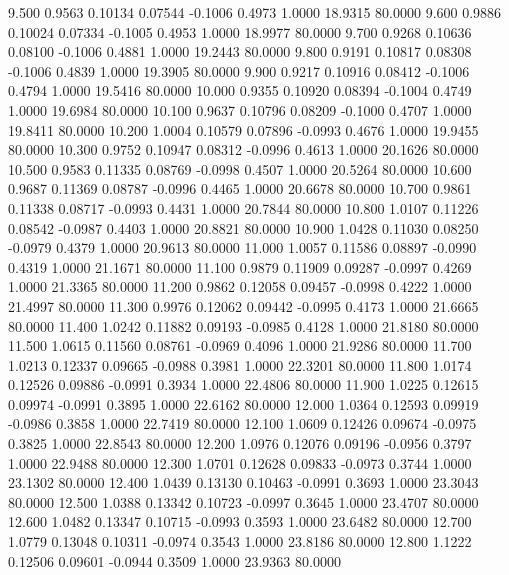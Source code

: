    9.500   0.9563   0.10134   0.07544  -0.1006   0.4973   1.0000  18.9315  80.0000
   9.600   0.9886   0.10024   0.07334  -0.1005   0.4953   1.0000  18.9977  80.0000
   9.700   0.9268   0.10636   0.08100  -0.1006   0.4881   1.0000  19.2443  80.0000
   9.800   0.9191   0.10817   0.08308  -0.1006   0.4839   1.0000  19.3905  80.0000
   9.900   0.9217   0.10916   0.08412  -0.1006   0.4794   1.0000  19.5416  80.0000
  10.000   0.9355   0.10920   0.08394  -0.1004   0.4749   1.0000  19.6984  80.0000
  10.100   0.9637   0.10796   0.08209  -0.1000   0.4707   1.0000  19.8411  80.0000
  10.200   1.0004   0.10579   0.07896  -0.0993   0.4676   1.0000  19.9455  80.0000
  10.300   0.9752   0.10947   0.08312  -0.0996   0.4613   1.0000  20.1626  80.0000
  10.500   0.9583   0.11335   0.08769  -0.0998   0.4507   1.0000  20.5264  80.0000
  10.600   0.9687   0.11369   0.08787  -0.0996   0.4465   1.0000  20.6678  80.0000
  10.700   0.9861   0.11338   0.08717  -0.0993   0.4431   1.0000  20.7844  80.0000
  10.800   1.0107   0.11226   0.08542  -0.0987   0.4403   1.0000  20.8821  80.0000
  10.900   1.0428   0.11030   0.08250  -0.0979   0.4379   1.0000  20.9613  80.0000
  11.000   1.0057   0.11586   0.08897  -0.0990   0.4319   1.0000  21.1671  80.0000
  11.100   0.9879   0.11909   0.09287  -0.0997   0.4269   1.0000  21.3365  80.0000
  11.200   0.9862   0.12058   0.09457  -0.0998   0.4222   1.0000  21.4997  80.0000
  11.300   0.9976   0.12062   0.09442  -0.0995   0.4173   1.0000  21.6665  80.0000
  11.400   1.0242   0.11882   0.09193  -0.0985   0.4128   1.0000  21.8180  80.0000
  11.500   1.0615   0.11560   0.08761  -0.0969   0.4096   1.0000  21.9286  80.0000
  11.700   1.0213   0.12337   0.09665  -0.0988   0.3981   1.0000  22.3201  80.0000
  11.800   1.0174   0.12526   0.09886  -0.0991   0.3934   1.0000  22.4806  80.0000
  11.900   1.0225   0.12615   0.09974  -0.0991   0.3895   1.0000  22.6162  80.0000
  12.000   1.0364   0.12593   0.09919  -0.0986   0.3858   1.0000  22.7419  80.0000
  12.100   1.0609   0.12426   0.09674  -0.0975   0.3825   1.0000  22.8543  80.0000
  12.200   1.0976   0.12076   0.09196  -0.0956   0.3797   1.0000  22.9488  80.0000
  12.300   1.0701   0.12628   0.09833  -0.0973   0.3744   1.0000  23.1302  80.0000
  12.400   1.0439   0.13130   0.10463  -0.0991   0.3693   1.0000  23.3043  80.0000
  12.500   1.0388   0.13342   0.10723  -0.0997   0.3645   1.0000  23.4707  80.0000
  12.600   1.0482   0.13347   0.10715  -0.0993   0.3593   1.0000  23.6482  80.0000
  12.700   1.0779   0.13048   0.10311  -0.0974   0.3543   1.0000  23.8186  80.0000
  12.800   1.1222   0.12506   0.09601  -0.0944   0.3509   1.0000  23.9363  80.0000
